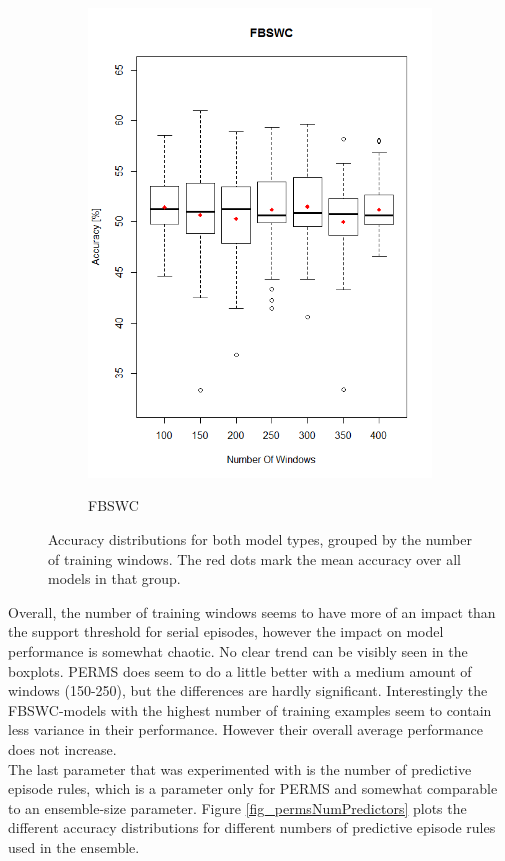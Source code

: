\begin{figure}[h]
\begin{subfigure}{.5\textwidth}
  \includegraphics[width=\linewidth]{fbswcNumWindows}
  \label{fig_fbswcSupportSerial}
  \caption{FBSWC}
\end{subfigure}
\caption[Accuracy Trend depending on the Number of Training Examples]{Accuracy distributions for both model types, grouped by the number of training windows. The red dots mark the mean accuracy over all models in that group.}
\label{fig_numWindowsBoxplots}
\end{figure}

Overall, the number of training windows seems to have more of an impact than the support threshold for serial episodes, however the impact on model performance is somewhat chaotic. No clear trend can be visibly seen in the boxplots. PERMS does seem to do a little better with a medium amount of windows (150-250), but the differences are hardly significant. Interestingly the FBSWC-models with the highest number of training examples seem to contain less variance in their performance. However their overall average performance does not increase. \\
The last parameter that was experimented with is the number of predictive episode rules, which is a parameter only for PERMS and somewhat comparable to an ensemble-size parameter. Figure \ref{fig_permsNumPredictors} plots the different accuracy distributions for different numbers of predictive episode rules used in the ensemble.

